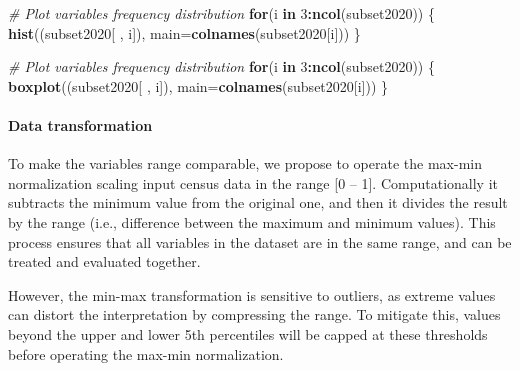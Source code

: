 \documentclass[
]{article}
\newenvironment{Shaded}{\begin{snugshade}}{\end{snugshade}}
\newcommand{\AttributeTok}[1]{\textcolor[rgb]{0.13,0.29,0.53}{#1}}
\newcommand{\CommentTok}[1]{\textcolor[rgb]{0.56,0.35,0.01}{\textit{#1}}}
\newcommand{\ControlFlowTok}[1]{\textcolor[rgb]{0.13,0.29,0.53}{\textbf{#1}}}
\newcommand{\DecValTok}[1]{\textcolor[rgb]{0.00,0.00,0.81}{#1}}
\newcommand{\FunctionTok}[1]{\textcolor[rgb]{0.13,0.29,0.53}{\textbf{#1}}}
\newcommand{\NormalTok}[1]{#1}
\newcommand{\SpecialCharTok}[1]{\textcolor[rgb]{0.81,0.36,0.00}{\textbf{#1}}}
\begin{document}
\begin{Shaded}
\begin{Highlighting}[]
\CommentTok{\# Plot variables\textquotesingle{} frequency distribution}
\ControlFlowTok{for}\NormalTok{(i }\ControlFlowTok{in} \DecValTok{3}\SpecialCharTok{:}\FunctionTok{ncol}\NormalTok{(subset2020)) \{      }
    \FunctionTok{hist}\NormalTok{((subset2020[ , i]),  }\AttributeTok{main=}\FunctionTok{colnames}\NormalTok{(subset2020[i]))}
\NormalTok{\}}
\end{Highlighting}
\end{Shaded}

\begin{Shaded}
\begin{Highlighting}[]
\CommentTok{\# Plot variables\textquotesingle{} frequency distribution}
\ControlFlowTok{for}\NormalTok{(i }\ControlFlowTok{in} \DecValTok{3}\SpecialCharTok{:}\FunctionTok{ncol}\NormalTok{(subset2020)) \{      }
    \FunctionTok{boxplot}\NormalTok{((subset2020[ , i]),  }\AttributeTok{main=}\FunctionTok{colnames}\NormalTok{(subset2020[i]))}
\NormalTok{\}}
\end{Highlighting}
\end{Shaded}

\paragraph{Data transformation}\label{data-transformation}

To make the variables range comparable, we propose to operate the max-min normalization scaling input census data in the range {[}0 -- 1{]}. Computationally it subtracts the minimum value from the original one, and then it divides the result by the range (i.e., difference between the maximum and minimum values). This process ensures that all variables in the dataset are in the same range, and can be treated and evaluated together.

However, the min-max transformation is sensitive to outliers, as extreme values can distort the interpretation by compressing the range. To mitigate this, values beyond the upper and lower 5th percentiles will be capped at these thresholds before operating the max-min normalization.
\end{document}
